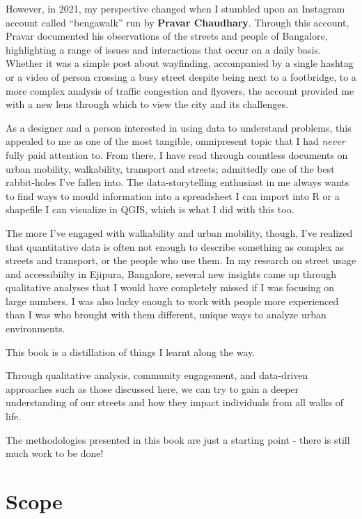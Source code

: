 \documentclass[
]{latex/krantz}
\begin{document}
However, in 2021, my perspective changed when I stumbled upon an Instagram account called ``bengawalk'' run by \textbf{Pravar Chaudhary}. Through this account, Pravar documented his observations of the streets and people of Bangalore, highlighting a range of issues and interactions that occur on a daily basis. Whether it was a simple post about wayfinding, accompanied by a single hashtag or a video of person crossing a busy street despite being next to a footbridge, to a more complex analysis of traffic congestion and flyovers, the account provided me with a new lens through which to view the city and its challenges.

As a designer and a person interested in using data to understand problems, this appealed to me as one of the most tangible, omnipresent topic that I had \emph{never} fully paid attention to. From there, I have read through countless documents on urban mobility, walkability, transport and streets; admittedly one of the best rabbit-holes I've fallen into. The data-storytelling enthusiast in me always wants to find ways to mould information into a spreadsheet I can import into R or a shapefile I can visualize in QGIS, which is what I did with this too.

The more I've engaged with walkability and urban mobility, though, I've realized that quantitative data is often not enough to describe something as complex as streets and transport, or the people who use them. In my research on street usage and accessibiilty in Ejipura, Bangalore, several new insights came up through qualitative analyses that I would have completely missed if I was focusing on large numbers. I was also lucky enough to work with people more experienced than I was who brought with them different, unique ways to analyze urban environments.

This book is a distillation of things I learnt along the way.

Through qualitative analysis, community engagement, and data-driven approaches such as those discussed here, we can try to gain a deeper understanding of our streets and how they impact individuals from all walks of life.

The methodologies presented in this book are just a starting point - there is still much work to be done!

\hypertarget{scope}{%
\section{Scope}\label{scope}}
\end{document}
